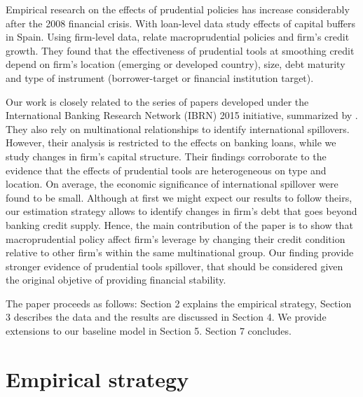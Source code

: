 \documentclass[12pt]{article}
\begin{document}
	Empirical research on the effects of prudential policies has increase considerably after the 2008 financial crisis. With loan-level data \cite*{jimenez2012macroprudential} study effects of capital buffers in Spain. Using firm-level data, \cite*{ayyagari2017credit} relate macroprudential policies and firm's credit growth. They found that the effectiveness of prudential tools at smoothing credit depend on firm's location (emerging or developed country), size, debt maturity and type of instrument (borrower-target or financial institution target).
	
	Our work is closely related to the series of papers developed under the International Banking Research Network (IBRN) 2015 initiative, summarized by \cite{buch2017international}. They also rely on multinational relationships to identify international spillovers. However, their analysis is restricted to the effects on banking loans, while we study changes in firm's capital structure. Their findings corroborate to the evidence that the effects of prudential tools are heterogeneous on type and location. On average, the economic significance of international spillover were found to be small. Although at first we might expect our results to follow theirs, our estimation strategy allows to identify changes in firm's debt that goes beyond banking credit supply. Hence, the main contribution of the paper is to show that macroprudential policy affect firm's leverage by changing their credit condition relative to other firm's within the same multinational group. Our finding provide stronger evidence of prudential tools spillover, that should be considered given the original objetive of providing financial stability.
	
	The paper proceeds as follows: Section 2 explains the empirical strategy, Section 3 describes the data and the results are discussed in Section 4. We provide extensions to our baseline model in Section 5. Section 7 concludes. 
	
	\section{Empirical strategy} \label{sec:strategy}
	
\end{document}
